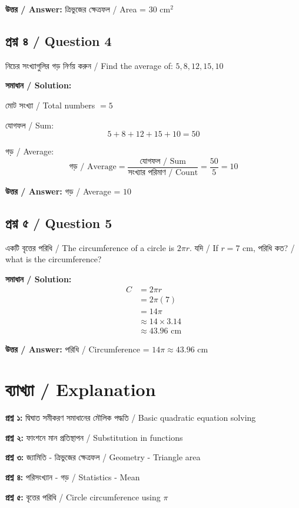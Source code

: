 \documentclass[12pt]{article}
\begin{document}
\textbf{উত্তর / Answer:} ত্রিভুজের ক্ষেত্রফল / Area = $30$ cm$^2$

\subsection*{প্রশ্ন ৪ / Question 4}
নিচের সংখ্যাগুলির গড় নির্ণয় করুন / Find the average of: $5, 8, 12, 15, 10$

\textbf{সমাধান / Solution:}

মোট সংখ্যা / Total numbers $= 5$

যোগফল / Sum:
$$5 + 8 + 12 + 15 + 10 = 50$$

গড় / Average:
$$\text{গড় / Average} = \frac{\text{যোগফল / Sum}}{\text{সংখ্যার পরিমাণ / Count}} = \frac{50}{5} = 10$$

\textbf{উত্তর / Answer:} গড় / Average = $10$

\subsection*{প্রশ্ন ৫ / Question 5}
একটি বৃত্তের পরিধি / The circumference of a circle is $2\pi r$. যদি / If $r = 7$ cm, পরিধি কত? / what is the circumference?

\textbf{সমাধান / Solution:}
\begin{align*}
    C &= 2\pi r \\
    &= 2\pi (7) \\
    &= 14\pi \\
    &\approx 14 \times 3.14 \\
    &\approx 43.96 \text{ cm}
\end{align*}

\textbf{উত্তর / Answer:} পরিধি / Circumference = $14\pi \approx 43.96$ cm

\section*{ব্যাখ্যা / Explanation}

\textbf{প্রশ্ন ১:} দ্বিঘাত সমীকরণ সমাধানের মৌলিক পদ্ধতি / Basic quadratic equation solving

\textbf{প্রশ্ন ২:} ফাংশনে মান প্রতিস্থাপন / Substitution in functions

\textbf{প্রশ্ন ৩:} জ্যামিতি - ত্রিভুজের ক্ষেত্রফল / Geometry - Triangle area

\textbf{প্রশ্ন ৪:} পরিসংখ্যান - গড় / Statistics - Mean

\textbf{প্রশ্ন ৫:} বৃত্তের পরিধি / Circle circumference using $\pi$
\end{document}
